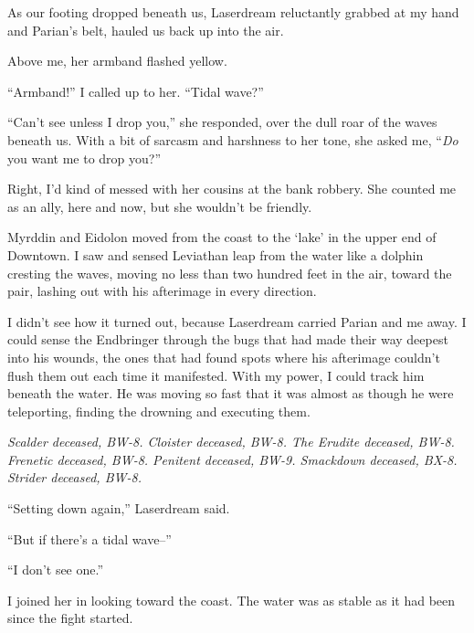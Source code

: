 As our footing dropped beneath us, Laserdream reluctantly grabbed at my hand and Parian's belt, hauled us back up into the air.



Above me, her armband flashed yellow.



``Armband!'' I called up to her. ``Tidal wave?''



``Can't see unless I drop you,'' she responded, over the dull roar of the waves beneath us.  With a bit of sarcasm and harshness to her tone, she asked me, ``\emph{Do} you want me to drop you?''



Right, I'd kind of messed with her cousins at the bank robbery.  She counted me as an ally, here and now, but she wouldn't be friendly.



Myrddin and Eidolon moved from the coast to the `lake' in the upper end of Downtown.  I saw and sensed Leviathan leap from the water like a dolphin cresting the waves, moving no less than two hundred feet in the air, toward the pair, lashing out with his afterimage in every direction.



I didn't see how it turned out, because Laserdream carried Parian and me away.  I could sense the Endbringer through the bugs that had made their way deepest into his wounds, the ones that had found spots where his afterimage couldn't flush them out each time it manifested.  With my power, I could track him beneath the water.  He was moving so fast that it was almost as though he were teleporting, finding the drowning and executing them.



\emph{Scalder deceased, BW-8.  Cloister deceased, BW-8.  The Erudite deceased, BW-8.  Frenetic deceased, BW-8.  Penitent deceased, BW-9.  Smackdown deceased, BX-8.  Strider deceased, BW-8.}



``Setting down again,'' Laserdream said.



``But if there's a tidal wave--''



``I don't see one.''



I joined her in looking toward the coast.  The water was as stable as it had been since the fight started.



